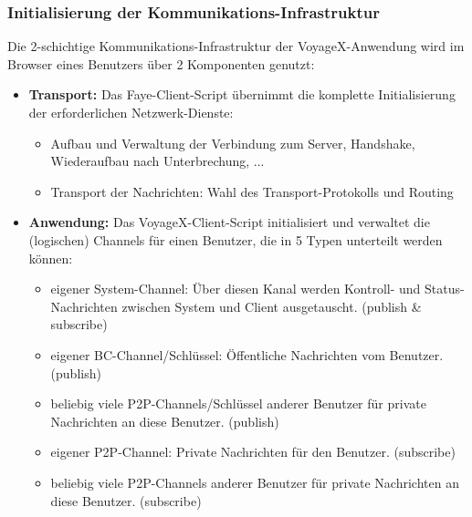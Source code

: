 \subsubsection{Initialisierung der Kommunikations-Infrastruktur}
Die 2-schichtige Kommunikations-Infrastruktur der VoyageX-Anwendung wird im Browser eines Benutzers über 2 Komponenten genutzt:
\begin{itemize}[leftmargin=*,noitemsep,topsep=1ex,parsep=0pt,partopsep=0pt]
\item \textbf{Transport:} Das Faye-Client-Script übernimmt die komplette Initialisierung der erforderlichen Netzwerk-Dienste:
	\begin{itemize}
		\item Aufbau und Verwaltung der Verbindung zum Server, Handshake, Wiederaufbau nach Unterbrechung, ...
		\item Transport der Nachrichten: Wahl des Transport-Protokolls und Routing
	\end{itemize}
\item \textbf{Anwendung:} Das VoyageX-Client-Script initialisiert und verwaltet die (logischen) Channels für einen Benutzer, die in 5 Typen unterteilt werden können:
	\begin{itemize}
		\item eigener System-Channel: Über diesen Kanal werden Kontroll- und Status-Nachrichten zwischen System und Client ausgetauscht. (publish \& subscribe)
		\item eigener BC-Channel/Schlüssel: Öffentliche Nachrichten vom Benutzer. (publish)
		\item beliebig viele P2P-Channels/Schlüssel anderer Benutzer für private Nachrichten an diese Benutzer. (publish)
		\item eigener P2P-Channel: Private Nachrichten für den Benutzer. (subscribe)
		\item beliebig viele P2P-Channels anderer Benutzer für private Nachrichten an diese Benutzer. (subscribe)
	\end{itemize}
\end{itemize}


